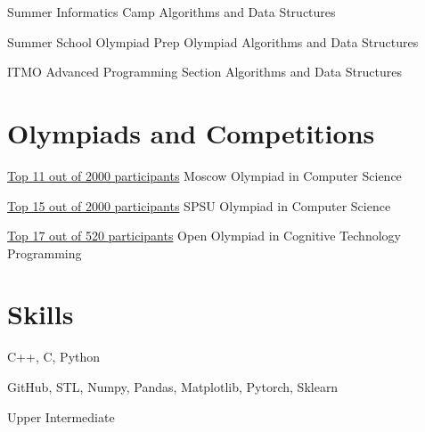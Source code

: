 \documentclass[12pt,a4paper]{moderncv}
\begin{document}
         {Summer Informatics Camp} {}{} {Algorithms and Data Structures} {}
        
         {Summer School Olympiad Prep} {}{} {Olympiad Algorithms and Data Structures} {}
        
         {ITMO Advanced Programming Section} {}{} {Algorithms and Data Structures} {}
    
    \section{Olympiads and Competitions}
        
         {\href {http://mos-inf.olimpiada.ru/winners10-11-2019} {Top 11 out of 2000 participants}}
            {Moscow Olympiad in Computer Science} {} {} {}
        
         {\href {https://diploma.rsr-olymp.ru/files/rsosh-diplomas-static/compiled-storage-2019/by-code/141299110240/color.pdf} {Top 15 out of 2000 participants}}
            {SPSU Olympiad in Computer Science} {} {} {}
            
         {\href {https://diploma.rsr-olymp.ru/files/rsosh-diplomas-static/compiled-storage-2019/by-code/142158979050/color.pdf} {Top 17 out of 520 participants}}
            {Open Olympiad in Cognitive Technology Programming} {} {} {}
    
    \section{Skills}
    
          {C++, C, Python}
        
         {GitHub, STL, Numpy, Pandas, Matplotlib, Pytorch, Sklearn}
    
         {Upper Intermediate}
        
\end{document}
